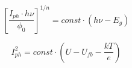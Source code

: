     \begin{equation}
        \left[ \frac{I_{ph} \cdot h\nu}{\phi _0} \right] ^{1/n} = const \cdot (h\nu - E_g)
        \label{eq_iph_linear_transform}
    \end{equation}

        \begin{equation}
        I_{ph}^2 = const \cdot (U-U_{fb}-\frac{kT}{e})
        \label{eq_iph_linear_transform_potential}
    \end{equation}

